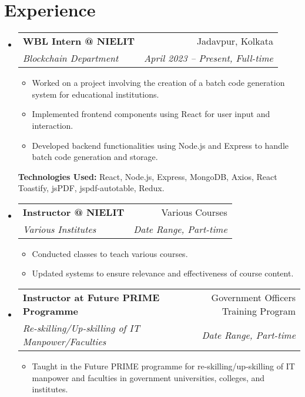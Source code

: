 \documentclass[letterpaper,11pt]{article}
\makeatletter
\newcommand{\resumeItem}[1]{
  \item\small{
    {#1 \vspace{-2pt}}
  }
}
\newcommand{\resumeSubheading}[4]{
  \vspace{-2pt}\item
    \begin{tabular*}{0.97\textwidth}[t]{l@{\extracolsep{\fill}}r}
      \textbf{#1} & #2 \\
      \textit{\small#3} & \textit{\small #4} \\
    \end{tabular*}\vspace{-7pt}
}
\newcommand{\resumeSubHeadingListStart}{\begin{itemize}[leftmargin=0.15in, label={}]}
\newcommand{\resumeSubHeadingListEnd}{\end{itemize}}
\newcommand{\resumeItemListStart}{\begin{itemize}}
\newcommand{\resumeItemListEnd}{\end{itemize}\vspace{-5pt}}
\makeatother
\begin{document}

\section{Experience}
\vspace{3pt}
\resumeSubHeadingListStart

\resumeSubheading
{WBL Intern @ NIELIT}{Jadavpur, Kolkata}
{Blockchain Department}{April 2023 -- Present, Full-time}
\resumeItemListStart
\resumeItem
{Worked on a project involving the creation of a batch code generation system for educational institutions.}
\resumeItem
{Implemented frontend components using React for user input and interaction.}
\resumeItem
{Developed backend functionalities using Node.js and Express to handle batch code generation and storage.}
\resumeItemListEnd
\textbf{Technologies Used:} React, Node.js, Express, MongoDB, Axios, React Toastify, jsPDF, jspdf-autotable, Redux.
\resumeSubheading
{Instructor @ NIELIT}{Various Courses}
{Various Institutes}{Date Range, Part-time}
\resumeItemListStart
\resumeItem
{Conducted classes to teach various courses.}
\resumeItem
{Updated systems to ensure relevance and effectiveness of course content.}
\resumeItemListEnd

\resumeSubheading
{Instructor at Future PRIME Programme}{Government Officers Training Program}
{Re-skilling/Up-skilling of IT Manpower/Faculties}{Date Range, Part-time}
\resumeItemListStart
\resumeItem
{Taught in the Future PRIME programme for re-skilling/up-skilling of IT manpower and faculties in government universities, colleges, and institutes.}
\resumeItemListEnd

\resumeSubHeadingListEnd




\end{document}
